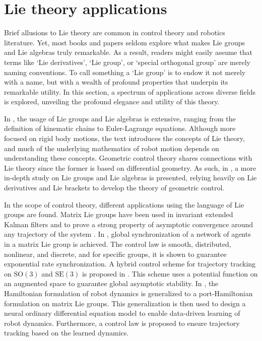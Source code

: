 \section{Lie theory applications} \label{sec:lit-review-lie-theory}
Brief allusions to Lie theory are common in control theory and robotics literature. Yet, most books and papers seldom explore what makes Lie groups and Lie algebras truly remarkable. As a result, readers might easily assume that terms like `Lie derivatives', `Lie group', or `special orthogonal group' are merely naming conventions. To call something a `Lie group' is to endow it not merely with a name, but with a wealth of profound properties that underpin its remarkable utility. In this section, a spectrum of applications across diverse fields is explored, unveiling the profound elegance and utility of this theory.

In \citet{Murray1994}, the usage of Lie groups and Lie algebras is extensive, ranging from the definition of kinematic chains to Euler-Lagrange equations. Although more focused on rigid body motions, the text introduces the concepts of Lie theory, and much of the underlying mathematics of robot motion depends on understanding these concepts. Geometric control theory shares connections with Lie theory since the former is based on differential geometry. As such, in \citet{Bullo2004}, a more in-depth study on Lie groups and Lie algebras is presented, relying heavily on Lie derivatives and Lie brackets to develop the theory of geometric control.

In the scope of control theory, different applications using the language of Lie groups are found. Matrix Lie groups have been used in invariant extended Kalman filters and to prove a strong property of asymptotic convergence around any trajectory of the system \citep{Barrau2017}. In \citet{Mccarthy2020}, global synchronization of a network of agents in a matrix Lie group is achieved. The control law is smooth, distributed, nonlinear, and discrete, and for specific groups, it is shown to guarantee exponential rate synchronization. A hybrid control scheme for trajectory tracking on $\text{SO}(3)$ and $\text{SE}(3)$ is proposed in \citet{Wang2022}. This scheme uses a potential function on an augmented space to guarantee global asymptotic stability. In \citet{Duong2024}, the Hamiltonian formulation of robot dynamics is generalized to a port-Hamiltonian formulation on matrix Lie groups. This generalization is then used to design a neural ordinary differential equation model to enable data-driven learning of robot dynamics. Furthermore, a control law is proposed to ensure trajectory tracking based on the learned dynamics.

